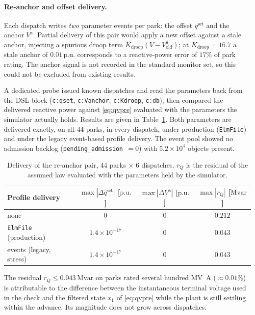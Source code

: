 \documentclass[11pt,a4paper]{article}
\newcommand{\pu}{\ensuremath{\mathrm{p.u.}}}
\newcommand{\Mvar}{\ensuremath{\mathrm{Mvar}}}
\begin{document}
\paragraph{Re-anchor and offset delivery.} Each dispatch writes \emph{two}
parameter events per park: the offset $q^{\mathrm{set}}$ and the anchor
$V^{\mathrm{a}}$. Partial delivery of this pair would apply a new offset
against a stale anchor, injecting a spurious droop term
$K_{\mathrm{droop}}(V - V^{\mathrm{a}}_{\text{old}})$; at
$K_{\mathrm{droop}} = 16.7$ a stale anchor of $0.01\,\pu$ corresponds to a
reactive-power error of $17\%$ of park rating. The anchor signal is not
recorded in the standard monitor set, so this could not be excluded from
existing results.

A dedicated probe issued known dispatches and read the parameters back from
the DSL block (\texttt{c:qset}, \texttt{c:Vanchor}, \texttt{c:Kdroop},
\texttt{c:db}), then compared the delivered reactive power against
\eqref{eq:qvpre} evaluated with the parameters the simulator actually holds.
Results are given in Table~\ref{tab:delivery}. Both parameters are delivered
exactly, on all 44 parks, in every dispatch, under production
(\texttt{ElmFile}) and under the legacy event-based profile delivery. The
event pool showed no admission backlog
(\texttt{pending\_admission}~$=0$) with $5.2\times10^4$ objects present.

\begin{table}[htbp]
  \centering
  \caption{Delivery of the re-anchor pair, 44 parks $\times$ 6 dispatches.
  $r_Q$ is the residual of the assumed law evaluated with the parameters
  held by the simulator.}
  \label{tab:delivery}
  \begin{tabular}{lccc}
    \toprule
    Profile delivery & $\max|\Delta q^{\mathrm{set}}|$ [\pu] &
    $\max|\Delta V^{\mathrm{a}}|$ [\pu] & $\max |r_Q|$ [\Mvar] \\
    \midrule
    none                       & $0$                  & $0$ & $0.212$ \\
    \texttt{ElmFile} (production) & $1.4\times10^{-17}$ & $0$ & $0.043$ \\
    events (legacy, stress)    & $1.4\times10^{-17}$   & $0$ & $0.043$ \\
    \bottomrule
  \end{tabular}
\end{table}

The residual $r_Q \le \SI{0.043}{\Mvar}$ on parks rated several hundred
\si{\mega\volt\ampere} ($\approx 0.01\%$) is attributable to the difference
between the instantaneous terminal voltage used in the check and the
filtered state $x_1$ of \eqref{eq:qvpre} while the plant is still settling
within the advance. Its magnitude does not grow across dispatches.
\end{document}
